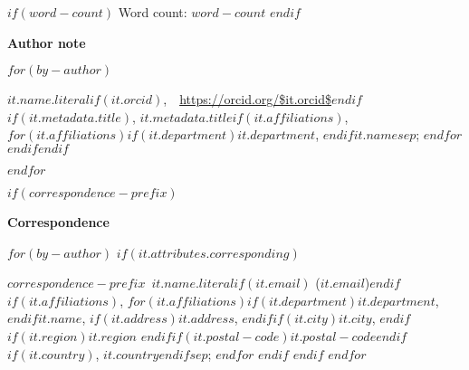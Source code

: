 
\begin{titlepage}
\center

{\let\newpage\relax\maketitle}

\thispagestyle{title}

\vspace{0.25in}

$if(word-count)$
{\center Word count: $word-count$}
$endif$

\vspace{0.5in}

\begin{center}

\textbf{Author note}

$for(by-author)$
\raggedright\setlength{\parindent}{0.5in}$it.name.literal$$if(it.orcid)$,~~\url{https://orcid.org/$it.orcid$}$endif$$if(it.metadata.title)$, $it.metadata.title$$if(it.affiliations)$, $for(it.affiliations)$$if(it.department)$$it.department$, $endif$$it.name$$sep$; $endfor$ $endif$$endif$

$endfor$

\end{center}

$if(correspondence-prefix)$
\begin{center}

\textbf{Correspondence}

$for(by-author)$
$if(it.attributes.corresponding)$
\par\raggedright\setlength{\parindent}{0.5in}$correspondence-prefix$~$it.name.literal$$if(it.email)$ (\href{mailto:$it.email$}{$it.email$})$endif$$if(it.affiliations)$, $for(it.affiliations)$$if(it.department)$$it.department$, $endif$$it.name$, $if(it.address)$$it.address$, $endif$$if(it.city)$$it.city$, $endif$$if(it.region)$$it.region$ $endif$$if(it.postal-code)$$it.postal-code$$endif$$if(it.country)$, $it.country$$endif$$sep$; $endfor$ $endif$
$endif$
$endfor$


\end{center}
\end{titlepage}
